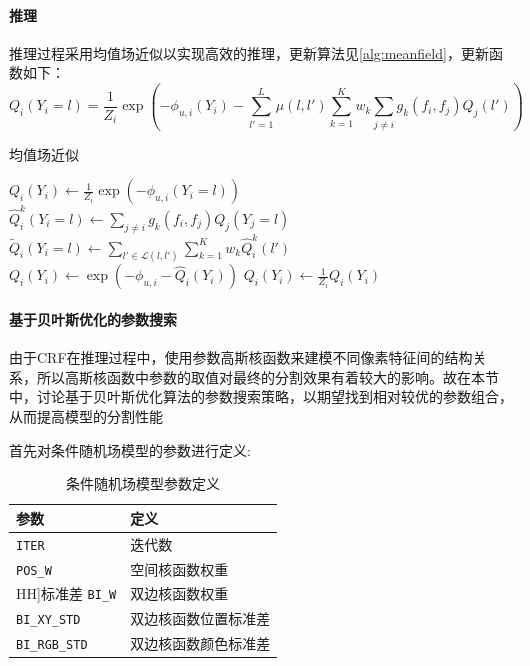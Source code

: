 \documentclass[a4paper,12pt]{ctexart}
\begin{document}
\paragraph{推理}
推理过程采用均值场近似以实现高效的推理，更新算法见\ref{alg:meanfield}，更新函数如下：
$$
Q_i(Y_i = l) = \frac{1}{Z_i} \exp \left( -\phi_{u,i}(Y_i) - \sum_{l' = 1}^{L} \mu(l, l') \sum_{k=1}^{K} w_k \sum_{j \neq i} g_k(f_i, f_j) Q_j(l') \right)
$$
\begin{algorithm}
    \caption{均值场近似}
    \label{alg:meanfield}
    \begin{algorithmic}[1]
    \STATE $Q_i(Y_i) \leftarrow \frac{1}{Z_i} \exp\left(-\phi_{u,i}(Y_i = l)\right)$ 
        \STATE $\hat{Q}_i^k(Y_i = l) \leftarrow \sum_{j \neq i} g_k(f_i, f_j) Q_j(Y_j = l)$ 
        \STATE $\tilde{Q}_i(Y_i = l) \leftarrow \sum_{l' \in \mathcal{L}(l, l')} \sum_{k=1}^{K} w_k \hat{Q}_i^k(l')$ 
        \STATE $Q_i(Y_i) \leftarrow \exp\left(-\phi_{u,i} - \hat{Q}_i(Y_i)\right)$ 
        \STATE $Q_i(Y_i) \leftarrow \frac{1}{Z_i} Q_i(Y_i)$ 
    \ENDWHILE
    \end{algorithmic}
\end{algorithm}

\paragraph{基于贝叶斯优化的参数搜索}
由于CRF在推理过程中，使用参数高斯核函数来建模不同像素特征间的结构关系，所以高斯核函数中参数的取值对最终的分割效果有着较大的影响。故在本节中，讨论基于贝叶斯优化算法的参数搜索策略，以期望找到相对较优的参数组合，从而提高模型的分割性能

首先对条件随机场模型的参数进行定义:
\begin{table}[H]
    \centering
    \begin{tabular}{@{}ll@{}}
    \toprule
    \textbf{参数}       & \textbf{定义}            \\ \midrule
    \texttt{ITER}        & 迭代数                  \\
    \texttt{POS\_W}      & 空间核函数权重          \\
HH]标准差        \H
    \texttt{BI\_W}       & 双边核函数权重          \\
    \texttt{BI\_XY\_STD}  & 双边核函数位置标准差    \\
    \texttt{BI\_RGB\_STD} & 双边核函数颜色标准差    \\ \bottomrule
    \end{tabular}
    \caption{条件随机场模型参数定义}
\end{table}
\end{document}
